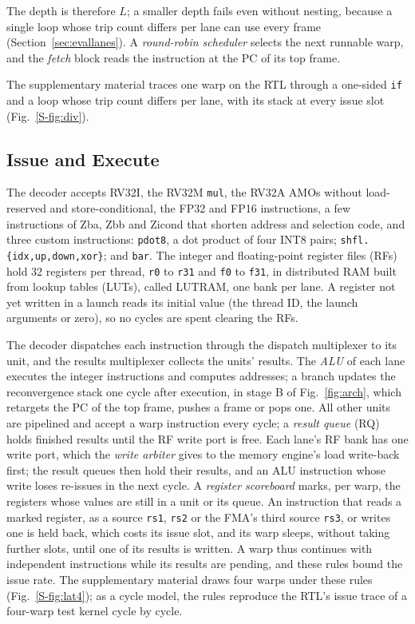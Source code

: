 \documentclass[journal]{IEEEtran}
\begin{document}
The depth is therefore $L$; a smaller depth fails even without nesting, because a
single loop whose trip count differs per lane can use every frame
(Section~\ref{sec:evallanes}). A \emph{round-robin scheduler} selects the next runnable
warp, and the \emph{fetch} block reads the instruction at the PC of its top frame.

The supplementary material traces one warp on the RTL through a one-sided
\texttt{if} and a loop whose trip count differs per lane, with its stack at every
issue slot (Fig.~\ref{S-fig:div}).

\subsection{Issue and Execute}
The decoder accepts RV32I, the RV32M \texttt{mul}, the RV32A AMOs without
load-reserved and store-conditional, the FP32 and FP16 instructions, a few
instructions of Zba, Zbb and Zicond that shorten address and selection code, and three
custom instructions: \texttt{pdot8}, a dot product of four INT8 pairs;
\texttt{shfl.\{idx,up,down,xor\}}; and \texttt{bar}. The integer and floating-point
register files (RFs) hold 32 registers per thread, \texttt{r0} to \texttt{r31} and
\texttt{f0} to \texttt{f31}, in distributed RAM built from lookup
tables (LUTs), called LUTRAM, one bank per lane. A
register not yet written in a launch reads its initial value (the thread ID, the launch
arguments or zero), so no cycles are spent clearing the RFs.

The decoder dispatches each instruction through the dispatch multiplexer to its unit,
and the results multiplexer collects the units' results. The \emph{ALU} of each lane
executes the integer instructions and computes addresses; a branch updates the
reconvergence stack one cycle after execution, in stage B of Fig.~\ref{fig:arch}, which
retargets the PC of the top frame, pushes a frame or pops one. All other units are
pipelined and accept a warp instruction every cycle; a \emph{result queue} (RQ) holds
finished results until the RF write port is free. Each lane's RF bank has one write
port, which the \emph{write arbiter} gives to the memory engine's load write-back
first; the result queues then hold their results, and an ALU instruction whose write
loses re-issues in the next cycle. A \emph{register scoreboard} marks, per warp, the
registers whose values are still in a unit or its queue. An instruction that reads a
marked register, as a source \texttt{rs1}, \texttt{rs2} or the FMA's third source
\texttt{rs3}, or writes one is held back, which costs its issue slot, and its warp
sleeps, without taking further
slots, until one of its results is written. A warp thus continues with independent
instructions while its results are pending, and these rules bound the issue rate.
The supplementary material draws four warps under these rules
(Fig.~\ref{S-fig:lat4}); as a cycle model, the rules reproduce the RTL's issue trace
of a four-warp test kernel cycle by cycle.
\end{document}
